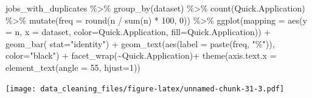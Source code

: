 \documentclass[
]{article}
\newenvironment{Shaded}{\begin{snugshade}}{\end{snugshade}}
\newcommand{\DataTypeTok}[1]{\textcolor[rgb]{0.87,0.87,0.75}{#1}}
\newcommand{\DecValTok}[1]{\textcolor[rgb]{0.86,0.86,0.80}{#1}}
\newcommand{\KeywordTok}[1]{\textcolor[rgb]{0.94,0.87,0.69}{#1}}
\newcommand{\NormalTok}[1]{\textcolor[rgb]{0.80,0.80,0.80}{#1}}
\newcommand{\OperatorTok}[1]{\textcolor[rgb]{0.94,0.94,0.82}{#1}}
\newcommand{\StringTok}[1]{\textcolor[rgb]{0.80,0.58,0.58}{#1}}
\begin{document}
\begin{Shaded}
\begin{Highlighting}[]
\NormalTok{jobs\_with\_duplicates }\OperatorTok{\%\textgreater{}\%}\StringTok{ }
\StringTok{  }\KeywordTok{group\_by}\NormalTok{(dataset) }\OperatorTok{\%\textgreater{}\%}\StringTok{ }
\StringTok{  }\KeywordTok{count}\NormalTok{(Quick.Application) }\OperatorTok{\%\textgreater{}\%}
\StringTok{  }\KeywordTok{mutate}\NormalTok{(}\DataTypeTok{freq =} \KeywordTok{round}\NormalTok{(n }\OperatorTok{/}\StringTok{ }\KeywordTok{sum}\NormalTok{(n) }\OperatorTok{*}\StringTok{ }\DecValTok{100}\NormalTok{, }\DecValTok{0}\NormalTok{)) }\OperatorTok{\%\textgreater{}\%}\StringTok{ }
\StringTok{  }\KeywordTok{ggplot}\NormalTok{(}\DataTypeTok{mapping =} \KeywordTok{aes}\NormalTok{(}\DataTypeTok{y =}\NormalTok{ n, }\DataTypeTok{x =}\NormalTok{ dataset, }\DataTypeTok{color=}\NormalTok{Quick.Application, }\DataTypeTok{fill=}\NormalTok{Quick.Application)) }\OperatorTok{+}\StringTok{ }\KeywordTok{geom\_bar}\NormalTok{( }\DataTypeTok{stat=}\StringTok{"identity"}\NormalTok{) }\OperatorTok{+}\StringTok{ }\KeywordTok{geom\_text}\NormalTok{(}\KeywordTok{aes}\NormalTok{(}\DataTypeTok{label =} \KeywordTok{paste}\NormalTok{(freq, }\StringTok{"\%"}\NormalTok{)), }\DataTypeTok{color=}\StringTok{"black"}\NormalTok{) }\OperatorTok{+}\StringTok{ }\KeywordTok{facet\_wrap}\NormalTok{(}\OperatorTok{\textasciitilde{}}\NormalTok{Quick.Application)}\OperatorTok{+}\StringTok{ }\KeywordTok{theme}\NormalTok{(}\DataTypeTok{axis.text.x =} \KeywordTok{element\_text}\NormalTok{(}\DataTypeTok{angle =} \DecValTok{55}\NormalTok{, }\DataTypeTok{hjust=}\DecValTok{1}\NormalTok{))}
\end{Highlighting}
\end{Shaded}

\texttt{[image: data\_cleaning\_files/figure-latex/unnamed-chunk-31-3.pdf]}
\end{document}
